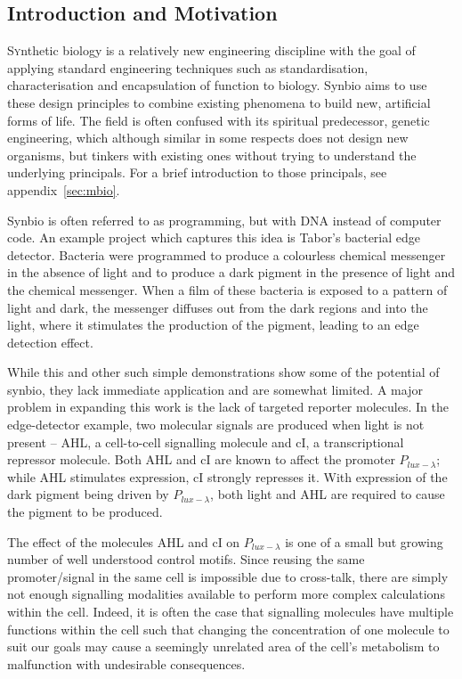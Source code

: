 \documentclass[twoside,a4paper]{article}
\begin{document}
\begin{multicols}{2} %

\section{Introduction and Motivation}

\lettrine[nindent=0em,lines=3]{S}ynthetic biology is a relatively new
engineering discipline with the goal of applying standard engineering techniques
such as standardisation, characterisation and encapsulation of function to 
biology.
Synbio aims to use these design principles to combine existing phenomena to 
build new, artificial forms of life.
The field is often confused with its spiritual predecessor, genetic 
engineering, which although similar in some respects does not design new
organisms, but tinkers with existing ones without trying to understand the
underlying principals.
For a brief introduction to those principals, see appendix~\ref{sec:mbio}.

Synbio is often referred to as programming, but with DNA instead of computer
code.
An example project which captures this idea is Tabor's bacterial edge
detector\cite{edgeDetector}.
Bacteria were programmed to produce a colourless chemical messenger in the 
absence of light and to produce a dark pigment in the presence of light and the
chemical messenger.
When a film of these bacteria is exposed to a pattern of light and dark, the
messenger diffuses out from the dark regions and into the light, where it
stimulates the production of the pigment, leading to an edge detection effect.

While this and other such simple demonstrations show some of the potential 
of synbio, they lack immediate application and are somewhat limited.
A major problem in expanding this work is the lack of targeted reporter
molecules.
In the edge-detector example, two molecular signals are produced when light is 
not present -- AHL, a cell-to-cell signalling molecule and cI, a
transcriptional repressor molecule.
Both AHL and cI are known to affect the promoter $P_{lux-\lambda}$; while AHL 
stimulates expression, cI strongly represses it.
With expression of the dark pigment being driven by $P_{lux-\lambda}$, 
both light and AHL are required to cause the pigment to be produced.

The effect of the molecules AHL and cI on $P_{lux-\lambda}$ is one of a small
but growing number of well understood control motifs.
Since reusing the same promoter/signal in the same cell is impossible due to 
cross-talk, there are simply not enough signalling modalities available to
perform more complex calculations within the cell.
Indeed, it is often the case that signalling molecules have multiple functions
within the cell such that changing the concentration of one molecule to suit
our goals may cause a seemingly unrelated area of the cell's metabolism to
malfunction with undesirable consequences.


\end{multicols}
\end{document}
